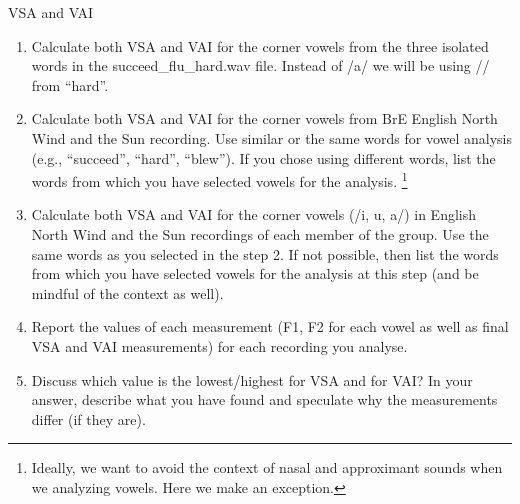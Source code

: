 \documentclass{../labbook}
\begin{document}
\begin{problem}{1}{10}{VSA and VAI}
\begin{enumerate}
    \item Calculate both VSA and VAI for the corner vowels from the three isolated words in the succeed\_flu\_hard.wav file. Instead of /a/ we will be using // from ``hard''.
    \item Calculate both VSA and VAI for the corner vowels from BrE English North Wind and the Sun recording. Use similar or the same words for vowel analysis (e.g., ``succeed'', ``hard'', ``blew''). If you chose using different words, list the words from which you have selected vowels for the analysis. \footnote{Ideally, we want to avoid the context of nasal and approximant sounds when we analyzing vowels. Here we make an exception.} 
    \item Calculate both VSA and VAI for the corner vowels (/i, u, a/) in English North Wind and the Sun recordings of each member of the group. Use the same words as you selected in the step 2. If not possible, then list the words from which you have selected vowels for the analysis at this step (and be mindful of the context as well).
    \item Report the values of each measurement (F1, F2 for each vowel as well as final VSA and VAI measurements) for each recording you analyse. 
    \item Discuss which value is the lowest/highest for VSA and for VAI? In your answer, describe what you have found and speculate why the measurements differ (if they are).
\end{enumerate}

\end{problem}
\end{document}
